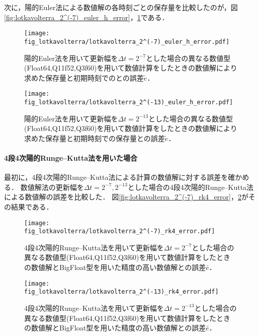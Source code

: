 次に，陽的Euler法による数値解の各時刻ごとの保存量を比較したのが，図\ref{fig:lotkavolterra_2^(-7)_euler_h_error}，\ref{fig:lotkavolterra_2^(-13)_euler_h_error}である．
\begin{figure}[H]
    \centering
    \begin{minipage}[b]{0.48\columnwidth}
        \centering
        \texttt{[image: fig\_lotkavolterra/lotkavolterra\_2^(-7)\_euler\_h\_error.pdf]}
        \caption{陽的Euler法を用いて更新幅を$\Delta t = 2^{-7}$とした場合の異なる数値型(Float64,Q11f52,Q3f60)を用いて数値計算をしたときの数値解により求めた保存量と初期時刻でのとの誤差$\tilde{e}$．}
        \label{fig:lotkavolterra_2^(-7)_euler_h_error}
    \end{minipage}
    \hspace{0.01\columnwidth}
    \begin{minipage}[b]{0.48\columnwidth}
        \centering
        \texttt{[image: fig\_lotkavolterra/lotkavolterra\_2^(-13)\_euler\_h\_error.pdf]}
        \caption{陽的Euler法を用いて更新幅を$\Delta t =  2^{-13}$とした場合の異なる数値型(Float64,Q11f52,Q3f60)を用いて数値計算をしたときの数値解により求めた保存量と初期時刻での保存量との誤差$\tilde{e}$．}
        \label{fig:lotkavolterra_2^(-13)_euler_h_error}
    \end{minipage}
\end{figure}

\paragraph*{4段4次陽的Runge--Kutta法を用いた場合}
最初に，4段4次陽的Runge--Kutta法による計算の数値解に対する誤差を確かめる．
数値解法の更新幅を$\Delta t = 2^{-7},2^{-13}$とした場合の4段4次陽的Runge--Kutta法による数値解の誤差を比較した．
図\ref{fig:lotkavolterra_2^(-7)_rk4_error}，\ref{fig:lotkavolterra_2^(-13)_rk4_error}がその結果である．
\begin{figure}[H]
    \centering
    \begin{minipage}[b]{0.48\columnwidth}
        \centering
        \texttt{[image: fig\_lotkavolterra/lotkavolterra\_2^(-7)\_rk4\_error.pdf]}
        \caption{4段4次陽的Runge--Kutta法を用いて更新幅を$\Delta t = 2^{-7}$とした場合の異なる数値型(Float64,Q11f52,Q3f60)を用いて数値計算をしたときの数値解とBigFloat型を用いた精度の高い数値解との誤差$\bar{e}$．}
        \label{fig:lotkavolterra_2^(-7)_rk4_error}
    \end{minipage}
    \hspace{0.01\columnwidth}
    \begin{minipage}[b]{0.48\columnwidth}
        \centering
        \texttt{[image: fig\_lotkavolterra/lotkavolterra\_2^(-13)\_rk4\_error.pdf]}
        \caption{4段4次陽的Runge--Kutta法を用いて更新幅を$\Delta t =  2^{-13}$とした場合の異なる数値型(Float64,Q11f52,Q3f60)を用いて数値計算をしたときの数値解とBigFloat型を用いた精度の高い数値解との誤差$\bar{e}$．}
        \label{fig:lotkavolterra_2^(-13)_rk4_error}
    \end{minipage}
\end{figure}

